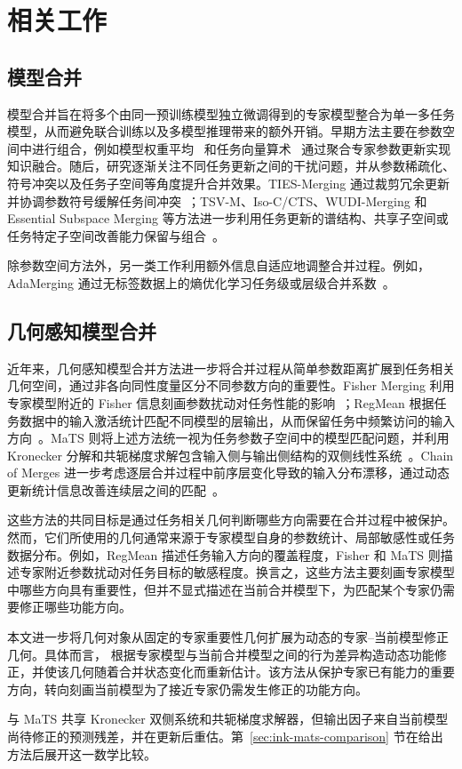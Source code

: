 \section{相关工作}
\label{sec:ink-related-work}

\subsection{模型合并}

模型合并旨在将多个由同一预训练模型独立微调得到的专家模型整合为单一多任务模型，从而避免联合训练以及多模型推理带来的额外开销。早期方法主要在参数空间中进行组合，例如模型权重平均~\citep{wortsman2022model} 和任务向量算术~\citep{ilharco2023editing} 通过聚合专家参数更新实现知识融合。随后，研究逐渐关注不同任务更新之间的干扰问题，并从参数稀疏化、符号冲突以及任务子空间等角度提升合并效果。TIES-Merging 通过裁剪冗余更新并协调参数符号缓解任务间冲突~\citep{yadav2023ties}；TSV-M、Iso-C/CTS、WUDI-Merging 和 Essential Subspace Merging 等方法进一步利用任务更新的谱结构、共享子空间或任务特定子空间改善能力保留与组合~\citep{gargiulo2024task,marczak2025no,cheng2025whoever,li2026essential}。

除参数空间方法外，另一类工作利用额外信息自适应地调整合并过程。例如，AdaMerging 通过无标签数据上的熵优化学习任务级或层级合并系数~\citep{yang2024adamerging}。

\subsection{几何感知模型合并}

近年来，几何感知模型合并方法进一步将合并过程从简单参数距离扩展到任务相关几何空间，通过非各向同性度量区分不同参数方向的重要性。Fisher Merging 利用专家模型附近的 Fisher 信息刻画参数扰动对任务性能的影响~\citep{matena2022fisher}；RegMean 根据任务数据中的输入激活统计匹配不同模型的层输出，从而保留任务中频繁访问的输入方向~\citep{jin2023regmean}。MaTS 则将上述方法统一视为任务参数子空间中的模型匹配问题，并利用 Kronecker 分解和共轭梯度求解包含输入侧与输出侧结构的双侧线性系统~\citep{tam2024mats}。Chain of Merges 进一步考虑逐层合并过程中前序层变化导致的输入分布漂移，通过动态更新统计信息改善连续层之间的匹配~\citep{buzzega2025chain}。

这些方法的共同目标是通过任务相关几何判断哪些方向需要在合并过程中被保护。然而，它们所使用的几何通常来源于专家模型自身的参数统计、局部敏感性或任务数据分布。例如，RegMean 描述任务输入方向的覆盖程度，Fisher 和 MaTS 则描述专家附近参数扰动对任务目标的敏感程度。换言之，这些方法主要刻画专家模型中哪些方向具有重要性，但并不显式描述在当前合并模型下，为匹配某个专家仍需要修正哪些功能方向。

本文进一步将几何对象从固定的专家重要性几何扩展为动态的专家--当前模型修正几何。具体而言，\method{} 根据专家模型与当前合并模型之间的行为差异构造动态功能修正，并使该几何随着合并状态变化而重新估计。该方法从保护专家已有能力的重要方向，转向刻画当前模型为了接近专家仍需发生修正的功能方向。

\method{} 与 MaTS 共享 Kronecker 双侧系统和共轭梯度求解器，但输出因子来自当前模型尚待修正的预测残差，并在更新后重估。第~\ref{sec:ink-mats-comparison} 节在给出方法后展开这一数学比较。
